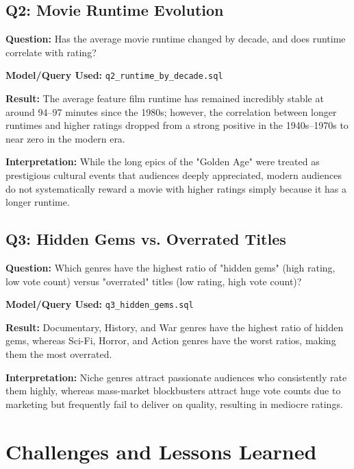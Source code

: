 \documentclass[runningheads]{llncs}
\begin{document}
\subsection{Q2: Movie Runtime Evolution}
\textbf{Question:} Has the average movie runtime changed by decade, and does runtime correlate with rating?

\noindent\textbf{Model/Query Used:} \texttt{q2\_runtime\_by\_decade.sql}

\noindent\textbf{Result:} The average feature film runtime has remained incredibly stable at around 94--97 minutes since the 1980s; however, the correlation between longer runtimes and higher ratings dropped from a strong positive in the 1940s--1970s to near zero in the modern era.

\noindent\textbf{Interpretation:} While the long epics of the "Golden Age" were treated as prestigious cultural events that audiences deeply appreciated, modern audiences do not systematically reward a movie with higher ratings simply because it has a longer runtime.


\subsection{Q3: Hidden Gems vs. Overrated Titles}
\textbf{Question:} Which genres have the highest ratio of "hidden gems" (high rating, low vote count) versus "overrated" titles (low rating, high vote count)?

\noindent\textbf{Model/Query Used:} \texttt{q3\_hidden\_gems.sql}

\noindent\textbf{Result:} Documentary, History, and War genres have the highest ratio of hidden gems, whereas Sci-Fi, Horror, and Action genres have the worst ratios, making them the most overrated.

\noindent\textbf{Interpretation:} Niche genres attract passionate audiences who consistently rate them highly, whereas mass-market blockbusters attract huge vote counts due to marketing but frequently fail to deliver on quality, resulting in mediocre ratings.

\section{Challenges and Lessons Learned}
\end{document}
